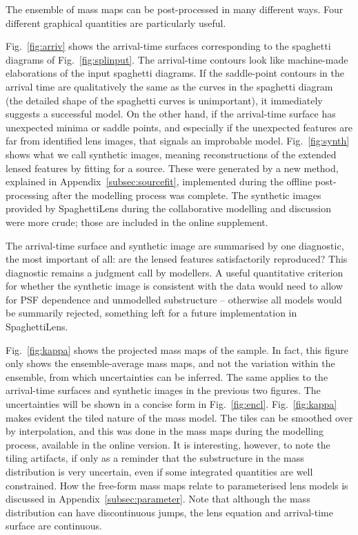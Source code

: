 The ensemble of mass maps can be post-processed in many different
ways.  Four different graphical quantities are particularly useful.

Fig.~\ref{fig:arriv} shows the arrival-time surfaces corresponding to
the spaghetti diagrams of Fig.~\ref{fig:splinput}.  The arrival-time
contours look like machine-made elaborations of the input spaghetti
diagrams.  If the saddle-point contours in the arrival time are
qualitatively the same as the curves in the spaghetti diagram (the
detailed shape of the spaghetti curves is unimportant), it immediately
suggests a successful model.  On the other hand, if the arrival-time
surface has unexpected minima or saddle points, and especially if the
unexpected features are far from identified lens images, that signals
an improbable model.  Fig.~\ref{fig:synth} shows what we call synthetic
images, meaning reconstructions of the extended lensed features by
fitting for a source.  These were generated by a new method, explained
in Appendix~\ref{subsec:sourcefit}, implemented during the offline
post-processing after the modelling process was complete.  The
synthetic images provided by SpaghettiLens during the collaborative
modelling and discussion were more crude; those are included in the
online supplement.

The arrival-time surface and synthetic image are summarised by one
diagnostic, the most important of all: are the lensed features
satisfactorily reproduced?  This diagnostic remains a judgment call by
modellers.  A useful quantitative criterion for whether the synthetic
image is consistent with the data would need to allow for PSF
dependence and unmodelled substructure -- otherwise all models would
be summarily rejected, something left for a future implementation
in SpaghettiLens.


Fig.~\ref{fig:kappa} shows the projected mass maps of the sample.  In
fact, this figure only shows the ensemble-average mass maps, and not
the variation within the ensemble, from which uncertainties can be
inferred. The same applies to the arrival-time surfaces and synthetic
images in the previous two figures. The uncertainties will be shown in
a concise form in Fig.~\ref{fig:encl}.  Fig.~\ref{fig:kappa} makes
evident the tiled nature of the mass model.  The tiles can be smoothed
over by interpolation, and this was done in the mass maps during the
modelling process, available in the online version.  It is
interesting, however, to note the tiling artifacts, if only as a
reminder that the substructure in the mass distribution is very
uncertain, even if some integrated quantities are  well
constrained.  How the free-form mass maps relate to parameterised lens
models is discussed in Appendix~\ref{subsec:parameter}.
Note that although the mass distribution can have discontinuous jumps,
the lens equation and arrival-time surface are continuous.

